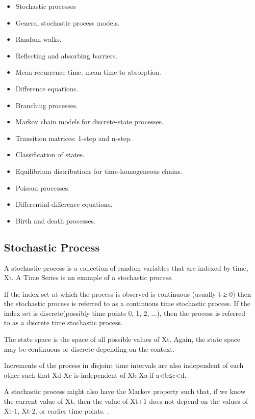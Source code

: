 \begin{itemize}
\item	Stochastic processes
\item	General stochastic process models.
\item	Random walks.
\item	Reflecting and absorbing barriers.
\item	Mean recurrence time, mean time to absorption.
\item	Difference equations.
\item	Branching processes.
\item	Markov chain models for discrete-state processes.
\item	Transition matrices: 1-step and n-step.
\item	Classification of states.
\item	Equilibrium distributions for time-homogeneous chains.
\item	Poisson processes.
\item	Differential-difference equations.
\item	Birth and death processes.
\end{itemize}

\subsection*{Stochastic Process}



A stochastic process is a collection of random variables that are indexed by time, {Xt}.  A Time Series is an example of a stochastic process.
 
If the index set at which the process is observed is continuous (usually t ≥ 0) then the stochastic process is referred to as a continuous time stochastic process. If the index set is discrete(possibly time points 0, 1, 2, ...), then the process is referred to as a discrete time stochastic process.
 
The state space is the space of all possible values of Xt.  Again, the state space may be continuous or discrete depending on the context.
 
Increments of the process in disjoint time intervals are also independent of each other such that Xd-Xc is independent of Xb-Xa if a<b≤c<d.
 
A stochastic process might also have the Markov property such that, if we know the current value of Xt, then the value of Xt+1 does not depend on the values of Xt-1, Xt-2, or earlier time points.
 . 
 
